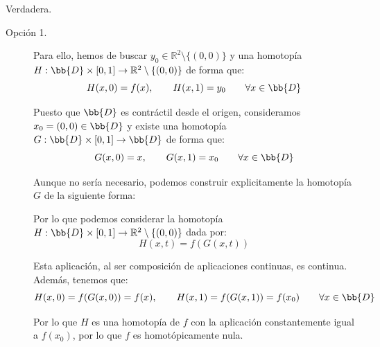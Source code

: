 \documentclass[12pt]{article}
\begin{document}
\begin{ejercicio}
\begin{enumerate}[label=\alph*)]
                Verdadera.
                \begin{description}
                    \item[Opción 1.] Para ello, hemos de buscar $y_0\in \mathbb{R}^2\setminus \{(0,0)\}$ y una homotopía $H:\bb{D}\times [0,1]\to \mathbb{R}^2\setminus \{(0,0)\}$ de forma que:
                    \begin{equation*}
                        H(x,0) = f(x), \qquad H(x,1) = y_0 \qquad \forall x\in \bb{D}
                    \end{equation*}

                    Puesto que $\bb{D}$ es contráctil desde el origen, consideramos $x_0=(0,0)\in \bb{D}$ y existe una homotopía $G:\bb{D}\times [0,1]\to \bb{D}$ de forma que:
                    \begin{equation*}
                        G(x,0) = x, \qquad G(x,1) = x_0 \qquad \forall x\in \bb{D}
                    \end{equation*}

                    Aunque no sería necesario, podemos construir explicitamente la homotopía $G$ de la siguiente forma:

                    Por lo que podemos considerar la homotopía $H:\bb{D}\times [0,1]\to \mathbb{R}^2\setminus \{(0,0)\}$ dada por:
                    \begin{equation*}
                        H(x,t) = f(G(x,t))
                    \end{equation*}

                    Esta aplicación, al ser composición de aplicaciones continuas, es continua. Además, tenemos que:
                    \begin{equation*}
                        H(x,0) = f(G(x,0)) = f(x), \qquad H(x,1) = f(G(x,1)) = f(x_0) \qquad \forall x\in \bb{D}
                    \end{equation*}

                    Por lo que $H$ es una homotopía de $f$ con la aplicación constantemente igual a $f(x_0)$, por lo que $f$ es homotópicamente nula.
                    


\end{description}
\end{enumerate}
\end{ejercicio}
\end{document}
